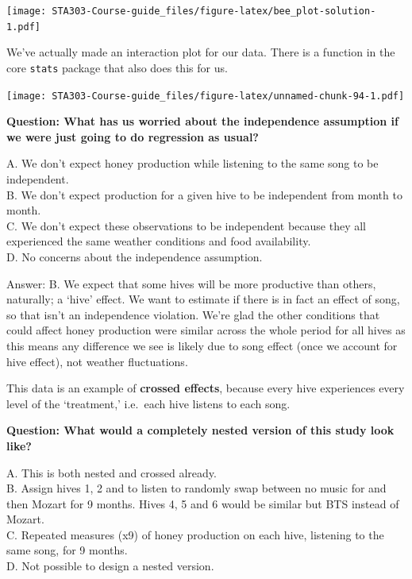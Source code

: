 \documentclass[
  openany]{book}
\newenvironment{Shaded}{\begin{snugshade}}{\end{snugshade}}
\newcommand{\FunctionTok}[1]{\textcolor[rgb]{0.00,0.00,0.00}{#1}}
\newcommand{\NormalTok}[1]{#1}
\newcommand{\SpecialCharTok}[1]{\textcolor[rgb]{0.00,0.00,0.00}{#1}}
\begin{document}
\texttt{[image: STA303-Course-guide\_files/figure-latex/bee\_plot-solution-1.pdf]}

We've actually made an interaction plot for our data. There is a function in the core \texttt{stats} package that also does this for us.

\begin{Shaded}
\end{Shaded}

\texttt{[image: STA303-Course-guide\_files/figure-latex/unnamed-chunk-94-1.pdf]}

\textbf{Question: What has us worried about the independence assumption if we were just going to do regression as usual?}

A. We don't expect honey production while listening to the same song to be independent.\\
B. We don't expect production for a given hive to be independent from month to month.\\
C. We don't expect these observations to be independent because they all experienced the same weather conditions and food availability.\\
D. No concerns about the independence assumption.

Answer: B. We expect that some hives will be more productive than others, naturally; a `hive' effect. We want to estimate if there is in fact an effect of song, so that isn't an independence violation. We're glad the other conditions that could affect honey production were similar across the whole period for all hives as this means any difference we see is likely due to song effect (once we account for hive effect), not weather fluctuations.

This data is an example of \textbf{crossed effects}, because every hive experiences every level of the `treatment,' i.e.~each hive listens to each song.

\textbf{Question: What would a completely nested version of this study look like?}

A. This is both nested and crossed already.\\
B. Assign hives 1, 2 and to listen to randomly swap between no music for and then Mozart for 9 months. Hives 4, 5 and 6 would be similar but BTS instead of Mozart.\\
C. Repeated measures (x9) of honey production on each hive, listening to the same song, for 9 months.\\
D. Not possible to design a nested version.
\end{document}
